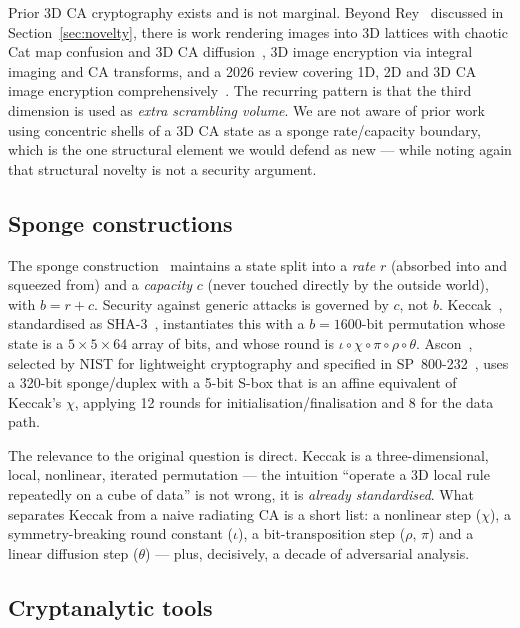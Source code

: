 \documentclass[11pt,a4paper]{article}
\theoremstyle{plain}
\theoremstyle{definition}
\theoremstyle{remark}
\begin{document}
Prior 3D CA cryptography exists and is not marginal. Beyond
Rey~\cite{rey2015} discussed in Section~\ref{sec:novelty}, there is work rendering
images into 3D lattices with chaotic Cat map confusion and 3D CA
diffusion~\cite{3dca2016}, 3D image encryption via integral imaging and CA
transforms, and a 2026 review covering 1D, 2D and 3D CA image encryption
comprehensively~\cite{carev2026}. The recurring pattern is that the third dimension is
used as \emph{extra scrambling volume}. We are not aware of prior work using
concentric shells of a 3D CA state as a sponge rate/capacity boundary, which is the
one structural element we would defend as new --- while noting again that structural
novelty is not a security argument.

\subsection{Sponge constructions}

The sponge construction~\cite{spongeindiff} maintains a state split into a
\emph{rate} $r$ (absorbed into and squeezed from) and a \emph{capacity} $c$ (never
touched directly by the outside world), with $b = r + c$. Security against generic
attacks is governed by $c$, not $b$. Keccak~\cite{keccak}, standardised as
SHA-3~\cite{fips202}, instantiates this with a $b = 1600$-bit permutation whose state
is a $5\times5\times64$ array of bits, and whose round is
$\iota\circ\chi\circ\pi\circ\rho\circ\theta$. Ascon~\cite{asconspec}, selected by NIST
for lightweight cryptography and specified in SP~800-232~\cite{sp800232}, uses a
320-bit sponge/duplex with a 5-bit S-box that is an affine equivalent of Keccak's
$\chi$, applying 12 rounds for initialisation/finalisation and 8 for the data path.

The relevance to the original question is direct. Keccak is a three-dimensional,
local, nonlinear, iterated permutation --- the intuition ``operate a 3D local rule
repeatedly on a cube of data'' is not wrong, it is \emph{already standardised}. What
separates Keccak from a naive radiating CA is a short list: a nonlinear step ($\chi$),
a symmetry-breaking round constant ($\iota$), a bit-transposition step ($\rho$, $\pi$)
and a linear diffusion step ($\theta$) --- plus, decisively, a decade of adversarial
analysis.

\subsection{Cryptanalytic tools}
\end{document}

